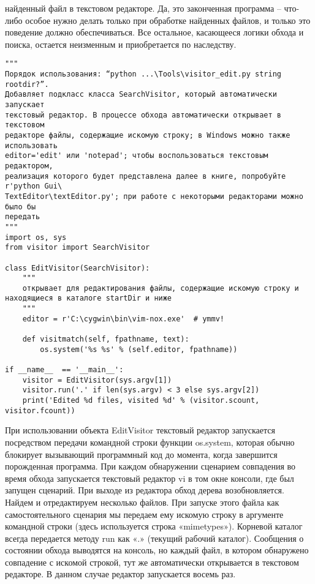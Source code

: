 \documentclass[12pt]{article}
\begin{document}
найденный файл в текстовом редакторе. Да, это законченная программа – что-либо особое нужно делать только при обработке найденных
файлов, и только это поведение должно обеспечиваться. Все остальное,
касающееся логики обхода и поиска, остается неизменным и приобретается по наследству.
\begin{verbatim}
"""
Порядок использования: “python ...\Tools\visitor_edit.py string rootdir?”.
Добавляет подкласс класса SearchVisitor, который автоматически запускает
текстовый редактор. В процессе обхода автоматически открывает в текстовом
редакторе файлы, содержащие искомую строку; в Windows можно также использовать
editor='edit' или 'notepad'; чтобы воспользоваться текстовым редактором,
реализация которого будет представлена далее в книге, попробуйте r'python Gui\
TextEditor\textEditor.py'; при работе с некоторыми редакторами можно было бы
передать
"""
import os, sys
from visitor import SearchVisitor

class EditVisitor(SearchVisitor):
    """
    открывает для редактирования файлы, содержащие искомую строку и
находящиеся в каталоге startDir и ниже
    """
    editor = r'C:\cygwin\bin\vim-nox.exe'  # ymmv!

    def visitmatch(self, fpathname, text):
        os.system('%s %s' % (self.editor, fpathname))

if __name__  == '__main__':
    visitor = EditVisitor(sys.argv[1])
    visitor.run('.' if len(sys.argv) < 3 else sys.argv[2])
    print('Edited %d files, visited %d' % (visitor.scount, visitor.fcount))
\end{verbatim}
При использовании объекта EditVisitor текстовый редактор запускается посредством передачи командной строки функции os.system, которая
обычно блокирует вызывающий программный код до момента, когда
завершится порожденная программа. При каждом
обнаружении сценарием совпадения во время обхода запускается текстовый редактор vi в том окне консоли, где был запущен сценарий. При
выходе из редактора обход дерева возобновляется.
Найдем и отредактируем несколько файлов. При запуске этого файла
как самостоятельного сценария мы передаем ему искомую строку в аргументе командной строки (здесь используется строка «mimetypes»).
Корневой каталог всегда передается методу run как «.» (текущий рабочий каталог). Сообщения о состоянии обхода выводятся на консоль, но
каждый файл, в котором обнаружено совпадение с искомой строкой,
тут же автоматически открывается в текстовом редакторе. В данном
случае редактор запускается восемь раз.
\end{document}
